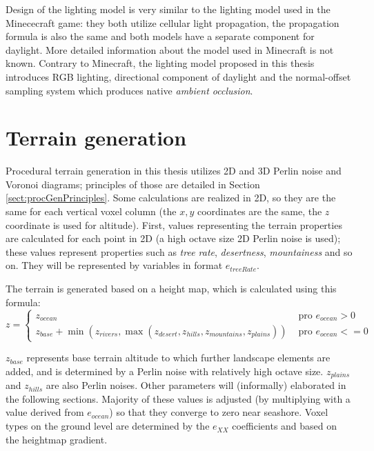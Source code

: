 Design of the lighting model is very similar to the lighting model used in the Minececraft game: they both utilize cellular light propagation, the propagation formula is also the same and both models have a separate component for daylight. More detailed information about the model used in Minecraft is not known. Contrary to Minecraft, the lighting model proposed in this thesis introduces RGB lighting, directional component of daylight and the normal-offset sampling system which produces native \textit{ambient occlusion}.

\section{Terrain generation}
Procedural terrain generation in this thesis utilizes 2D and 3D Perlin noise and Voronoi diagrams; principles of those are detailed in Section \ref{sect:procGenPrinciples}. Some calculations are realized in 2D, so they are the same for each vertical voxel column (the $x, y$ coordinates are the same, the $z$ coordinate is used for altitude). First, values representing the terrain properties are calculated for each point in 2D (a high octave size 2D Perlin noise is used); these values represent properties such as \textit{tree rate}, \textit{desertness}, \textit{mountainess} and so on. They will be represented by variables in format $e_{treeRate}$.

The terrain is generated based on a height map, which is calculated using this formula:
\begin{equation}
	z = \left\{ \begin{aligned}
		z_{ocean} & \text{ pro $e_{ocean} > 0$} \\
		z_{base} + \min(z_{rivers}, \max(z_{desert}, z_{hills}, z_{mountains}, z_{plains})) & \text{ pro $e_{ocean} <= 0$}
	\end{aligned}
	\right.
\end{equation}

$z_{base}$ represents base terrain altitude to which further landscape elements are added, and is determined by a Perlin noise with relatively high octave size. $z_{plains}$ and $z_{hills}$ are also Perlin noises. Other parameters will (informally) elaborated in the following sections. Majority of these values is adjusted (by multiplying with a value derived from $e_{ocean}$) so that they converge to zero near seashore. Voxel types on the ground level are determined by the $e_{XX}$ coefficients and based on the heightmap gradient.

